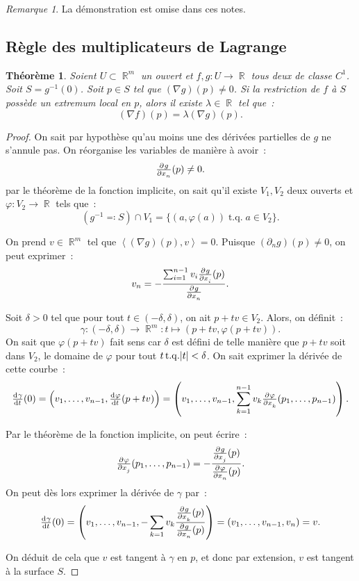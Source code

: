 \documentclass{article}
\DeclareMathOperator{\R}{\mathbb R}
\DeclareMathOperator{\tq}{ t.q. }
\newcommand{\scpr}[2]{{\left\langle#1, #2\right\rangle}}
\newtheorem{thm}{Théorème}[section]
\theoremstyle{definition}
\theoremstyle{remark}
\newtheorem*{rmq}{Remarque}
\begin{document}
		\begin{rmq} La démonstration est omise dans ces notes.
		\end{rmq}

	\subsection{Règle des multiplicateurs de Lagrange}
		\begin{thm} Soient $U \subset \R^m$ un ouvert et $f, g : U \to \R$ tous deux de classe $C^1$. Soit $S = g^{-1}(0)$. Soit $p \in S$ tel que
		$(\nabla g)(p) \neq 0$. Si la restriction de $f$ à $S$ possède un extremum local en $p$, alors il existe $\lambda \in \R$ tel que~:
		\[(\nabla f)(p) = \lambda (\nabla g)(p).\]
		\end{thm}

		\begin{proof} On sait par hypothèse qu'au moins une des dérivées partielles de $g$ ne s'annule pas. On réorganise les variables de manière à avoir~:
		\[\pd g{x_n}(p) \neq 0.\]
		par le théorème de la fonction implicite, on sait qu'il existe $V_1, V_2$ deux ouverts et $\varphi : V_2 \to \R$ tels que~:
		\[(g^{-1} \eqqcolon S) \cap V_1 = \{(a, \varphi(a)) \tq a \in V_2\}.\]

		On prend $v \in \R^m$ tel que $\scpr {(\nabla g)(p)}v = 0$. Puisque $(\partial_n g)(p) \neq 0$, on peut exprimer~:
		\[v_n = -\frac {\sum_{i=1}^{n-1}v_i\pd g{x_i}(p)}{\pd g{x_n}}.\]

		Soit $\delta > 0$ tel que pour tout $t \in (-\delta, \delta)$, on ait $p + tv \in V_2$. Alors, on définit~:
		\[\gamma : (-\delta, \delta) \to \R^m : t \mapsto (p + tv, \varphi(p + tv)).\]
		On sait que $\varphi(p+tv)$ fait sens car $\delta$ est défini de telle manière que $p + tv$ soit dans $V_2$, le domaine de $\varphi$ pour tout
		$t \tq \abs t < \delta$. On sait exprimer la dérivée de cette courbe~:
		\[\od \gamma t(0) = \left(v_1, \dotsc, v_{n-1}, \od \varphi t(p + tv)\right)
		= \left(v_1, \dotsc, v_{n-1}, \sum_{k=1}^{n-1}v_k\pd \varphi{x_k}(p_1, \dotsc, p_{n-1})\right).\]

		Par le théorème de la fonction implicite, on peut écrire~:
		\[\pd \varphi{x_j}(p_1, \dotsc, p_{n-1}) = -\frac {\pd g{x_j}(p)}{\pd \varphi {x_n}(p)}.\]
		On peut dès lors exprimer la dérivée de $\gamma$ par~:
		\[\od \gamma t(0) = \left(v_1, \dotsc, v_{n-1}, -\sum_{k=1}v_k\frac {\pd g{x_k}(p)}{\pd g{x_n}(p)}\right) = (v_1, \dotsc, v_{n-1}, v_n) = v.\]

		On déduit de cela que $v$ est tangent à $\gamma$ en $p$, et donc par extension, $v$ est tangent à la surface $S$.


\end{proof}
\end{document}

